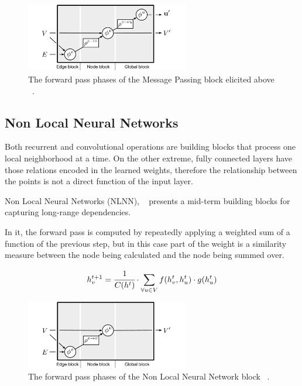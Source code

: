 \begin{figure}[!htb]
    \centering
    \includegraphics[height=3.0cm]{fig/content/graph_nets/blocks/mpnn.pdf}
    \caption{The forward pass phases of the Message Passing block elicited above ~\cite{Battaglia_2018}.}
\end{figure}



\subsection{Non Local Neural Networks}

Both recurrent and convolutional operations are building blocks that process one local neighborhood at a time. On the other extreme, fully connected layers have those relations encoded in the learned weights, therefore the relationship between the points is not a direct function of the input layer. 

Non Local Neural Networks (NLNN), ~\cite{Wang_2018} presents a mid-term building blocks for capturing long-range dependencies.

In it, the forward pass is computed by repeatedly applying a weighted sum of a function of the previous step, but in this case part of the weight is a similarity measure between the node being calculated and the node being summed over.

\begin{equation}
    h^{t+1}_v = 
    \cfrac{1}{C(h^t)} 
    \cdot \sum_{\forall u \in V} {
        f(h^t_v,h^t_u) \cdot g(h^t_u)
    }
\end{equation}

\begin{figure}[!htb]
    \centering
    \includegraphics[height=3.0cm]{fig/content/graph_nets/blocks/nlnn.pdf}
    \caption{The forward pass phases of the Non Local Neural Network block ~\cite{Battaglia_2018}.}
\end{figure}


